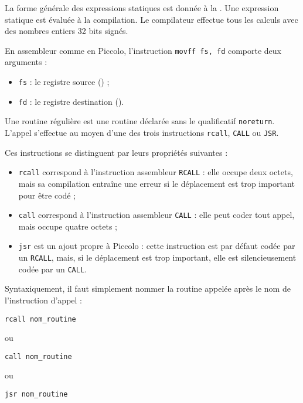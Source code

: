 La forme générale des expressions statiques est donnée à la . Une expression statique est évaluée à la compilation. Le compilateur effectue tous les calculs avec des nombres entiers 32 bits signés.








En assembleur comme en Piccolo, l'instruction \texttt{movff fs, fd} comporte deux arguments :
\begin{itemize}
  \item \texttt{fs} : le registre source () ;
  \item \texttt{fd} : le registre destination ().
\end{itemize}









Une routine régulière est une routine déclarée sans le qualificatif \texttt{noreturn}. L'appel s’effectue au moyen d’une des trois instructions \texttt{rcall}, \texttt{CALL} ou \texttt{JSR}.

Ces instructions se distinguent par leurs propriétés suivantes :
\begin{itemize}
  \item \texttt{rcall} correspond à l’instruction assembleur \texttt{RCALL} : elle occupe deux octets, mais sa compilation entraîne une erreur si le déplacement est trop important pour être codé ;
  \item \texttt{call} correspond à l’instruction assembleur \texttt{CALL} : elle peut coder tout appel, mais occupe quatre octets ;
  \item \texttt{jsr} est un ajout propre à Piccolo : cette instruction est par défaut codée par un \texttt{RCALL}, mais, si le déplacement est trop important, elle est silencieusement codée par un \texttt{CALL}.
\end{itemize}

Syntaxiquement, il faut simplement nommer la routine appelée après le nom de l’instruction d’appel :

\begin{lstlisting}[language=piccolo]
rcall nom_routine
\end{lstlisting}
ou
\begin{lstlisting}[language=piccolo]
call nom_routine
\end{lstlisting}
ou
\begin{lstlisting}[language=piccolo]
jsr nom_routine
\end{lstlisting}





